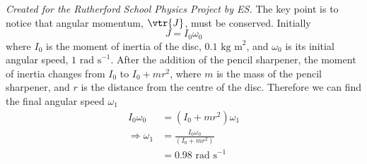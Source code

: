 
\begin{problem}
{
}
{\textit{Created for the Rutherford School Physics Project by ES.}}
{
The key point is to notice that angular momentum, $\vtr{J}$, must be conserved. Initially
\begin{equation*}
J=I_0\omega_0
\end{equation*}
where $I_0$ is the moment of inertia of the disc, $0.1\textrm{ kg m}^2$, and $\omega_0$ is its initial angular speed, $1\textrm{ rad s}^{-1}$. After the addition of the pencil sharpener, the moment of inertia changes from $I_0$ to $I_0+mr^2$, where $m$ is the mass of the pencil sharpener, and $r$ is the distance from the centre of the disc. Therefore we can find the final angular speed $\omega_1$
\begin{align*}
I_0\omega_0&=\left(I_0+mr^2\right)\omega_1 \\
\Rightarrow \omega_1&=\frac{I_0\omega_0}{\left(I_0+mr^2\right)} \\
&=0.98\textrm{ rad s}^{-1}
\end{align*}
}
\end{problem} 